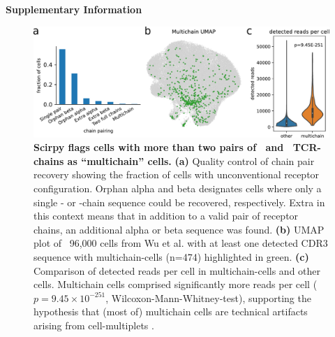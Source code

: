 \documentclass{article}
\begin{document}
\begin{center}
    \normalfont\Large\bfseries{Supplementary Information}
\end{center}
\vspace*{60pt}

\begin{figure}[!hb]
  \centering
  \includegraphics[width=7in]{../figures/multichains.pdf}
  \caption{
    \textbf{Scirpy flags cells with more than two pairs of \textalpha\ and \textbeta\ TCR-chains as “multichain” cells.} 
    \textbf{(a)} Quality control of chain pair recovery showing the fraction of cells 
    with unconventional receptor configuration. Orphan alpha and beta designates cells 
    where only a single \textalpha- or \textbeta-chain sequence could be recovered, 
    respectively. Extra in this context means that in addition to a valid pair of
    receptor chains, an additional alpha or beta sequence was found. 
    \textbf{(b)} UMAP plot of ~96,000 cells from Wu et al. \cite{Wu2020-vp} with at
    least one detected CDR3 sequence with multichain-cells (n=474) highlighted in green.
    \textbf{(c)} Comparison of detected reads per cell in multichain-cells and other cells.
    Multichain cells comprised significantly more reads per cell
    ($p=9.45 \times 10^{-251}$, Wilcoxon-Mann-Whitney-test), supporting the hypothesis 
    that (most of) multichain cells are technical artifacts arising from 
    cell-multiplets \cite{Ilicic2016-ny}. }
\end{figure}
\end{document}
